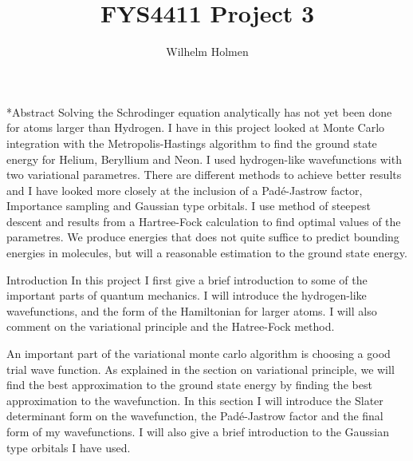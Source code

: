 \documentclass[a4paper, 12pt, titlepage]{article}
\author{Wilhelm Holmen}
\title{FYS4411 Project 3}
\begin{document}
 \maketitle
 \newpage

 \tableofcontents

 \newpage

\begin{subsection}*{Abstract}
 Solving the Schrodinger equation analytically has not yet been done for atoms larger than Hydrogen. I have in this project looked at Monte Carlo integration with the Metropolis-Hastings algorithm to find the ground state energy for Helium, Beryllium and Neon. I used hydrogen-like wavefunctions with two variational parametres. There are different methods to achieve better results and I have looked more closely at the inclusion of a Padé-Jastrow factor, Importance sampling and Gaussian type orbitals. I use method of steepest descent and results from a Hartree-Fock calculation to find optimal values of the parametres. We produce energies that does not quite suffice to predict bounding energies in molecules, but will a reasonable estimation to the ground state energy. 
\end{subsection}

\begin{section}{Introduction}
 In this project I first give a brief introduction to some of the important parts of quantum mechanics. I will introduce the hydrogen-like wavefunctions, and the form of the Hamiltonian for larger atoms. I will also comment on the variational principle and the Hatree-Fock method. \par
 An important part of the variational monte carlo algorithm is choosing a good trial wave function. As explained in the section on variational principle, we will find the best approximation to the ground state energy by finding the best approximation to the wavefunction. In this section I will introduce the Slater determinant form on the wavefunction, the Padé-Jastrow factor and the final form of my wavefunctions. I will also give a brief introduction to the Gaussian type orbitals I have used. 
\end{section}
\end{document}
